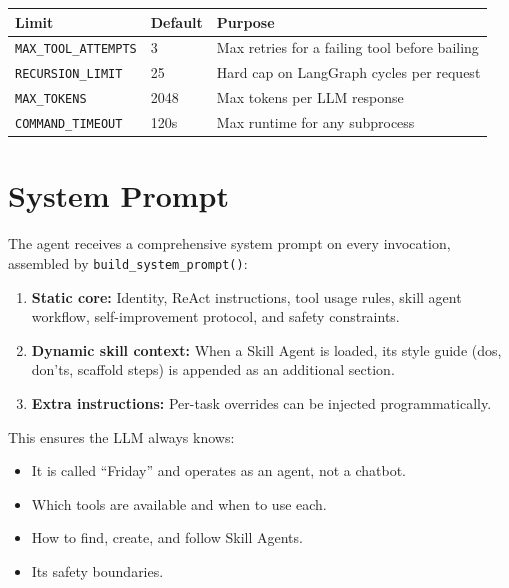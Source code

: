 \documentclass[11pt,a4paper]{article}
\begin{document}
\begin{table}[h!]
\centering
\begin{tabular}{@{}llp{7cm}@{}}
\toprule
\textbf{Limit} & \textbf{Default} & \textbf{Purpose} \\
\midrule
\texttt{MAX\_TOOL\_ATTEMPTS} & 3 & Max retries for a failing tool before bailing \\
\texttt{RECURSION\_LIMIT} & 25 & Hard cap on LangGraph cycles per request \\
\texttt{MAX\_TOKENS} & 2048 & Max tokens per LLM response \\
\texttt{COMMAND\_TIMEOUT} & 120s & Max runtime for any subprocess \\
\bottomrule
\end{tabular}
\end{table}

\section{System Prompt}

The agent receives a comprehensive system prompt on every invocation, assembled by \texttt{build\_system\_prompt()}:

\begin{enumerate}[leftmargin=*]
  \item \textbf{Static core:} Identity, ReAct instructions, tool usage rules, skill agent workflow, self-improvement protocol, and safety constraints.
  \item \textbf{Dynamic skill context:} When a Skill Agent is loaded, its style guide (dos, don'ts, scaffold steps) is appended as an additional section.
  \item \textbf{Extra instructions:} Per-task overrides can be injected programmatically.
\end{enumerate}

This ensures the LLM always knows:
\begin{itemize}[leftmargin=*]
  \item It is called ``Friday'' and operates as an agent, not a chatbot.
  \item Which tools are available and when to use each.
  \item How to find, create, and follow Skill Agents.
  \item Its safety boundaries.
\end{itemize}

\end{document}

